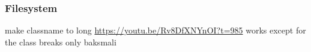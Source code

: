 \subsubsection{Filesystem}
make classname to long\newline
\url{https://youtu.be/Rv8DfXNYnOI?t=985} works except for the class\newline
breaks only baksmali
